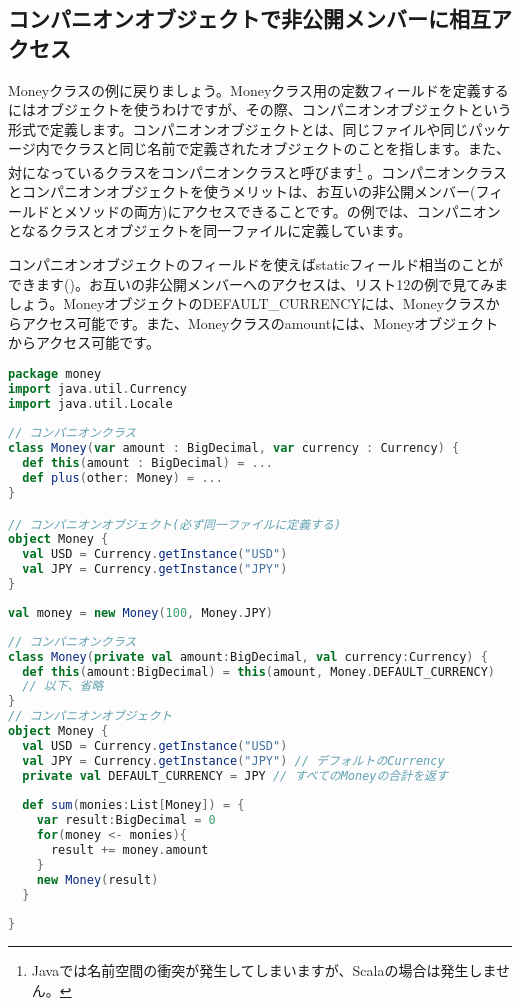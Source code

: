 \subsection{コンパニオンオブジェクトで非公開メンバーに相互アクセス}
Moneyクラスの例に戻りましょう。Moneyクラス用の定数フィールドを定義するにはオブジェクトを使うわけですが、その際、コンパニオンオブジェクトという形式で定義します。コンパニオンオブジェクトとは、同じファイルや同じパッケージ内でクラスと同じ名前で定義されたオブジェクトのことを指します。また、対になっているクラスをコンパニオンクラスと呼びます\footnote{Javaでは名前空間の衝突が発生してしまいますが、Scalaの場合は発生しません。} 。コンパニオンクラスとコンパニオンオブジェクトを使うメリットは、お互いの非公開メンバー(フィールドとメソッドの両方)にアクセスできることです。の例では、コンパニオンとなるクラスとオブジェクトを同一ファイルに定義しています。

コンパニオンオブジェクトのフィールドを使えばstaticフィールド相当のことができます()。お互いの非公開メンバーへのアクセスは、リスト12の例で見てみましょう。MoneyオブジェクトのDEFAULT\_CURRENCYには、Moneyクラスからアクセス可能です。また、Moneyクラスのamountには、Moneyオブジェクトからアクセス可能です。

\begin{lstlisting}[language=scala, label=src:companion_object, caption=コンパニオンオブジェクトの例。コンパニオンとなるクラスとオブジェクトを同一ファイルに定義する]
package money
import java.util.Currency
import java.util.Locale
 
// コンパニオンクラス
class Money(var amount : BigDecimal, var currency : Currency) {
  def this(amount : BigDecimal) = ...
  def plus(other: Money) = ... 
}

// コンパニオンオブジェクト(必ず同一ファイルに定義する)
object Money {
  val USD = Currency.getInstance("USD")
  val JPY = Currency.getInstance("JPY")
}
\end{lstlisting}

\begin{lstlisting}[language=scala, label=src:object_field, caption=第二引数にコンパニオンオブジェクトのフィールドを指定]
val money = new Money(100, Money.JPY)
\end{lstlisting}

\begin{lstlisting}[language=scala, label=src:privilege_access, caption=コンパニオンオブジェクトを使えばお互いの非公開メンバーにアクセスできる。amountとDEFAULT\_CURRENCYは共にprivateであることに注目]
// コンパニオンクラス
class Money(private val amount:BigDecimal, val currency:Currency) {
  def this(amount:BigDecimal) = this(amount, Money.DEFAULT_CURRENCY)
  // 以下、省略
}
// コンパニオンオブジェクト
object Money {
  val USD = Currency.getInstance("USD")
  val JPY = Currency.getInstance("JPY") // デフォルトのCurrency
  private val DEFAULT_CURRENCY = JPY // すべてのMoneyの合計を返す
   
  def sum(monies:List[Money]) = {
    var result:BigDecimal = 0
    for(money <- monies){
      result += money.amount
    }
    new Money(result)
  }
   
}
\end{lstlisting}

